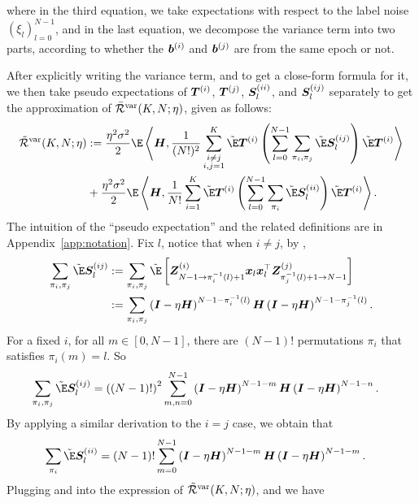 where in the third equation, we take expectations with respect to the label noise$(\xi_l)_{l=0}^{N-1}$, and in the last equation, we decompose the variance term into two parts, according to whether the ${\bm{b}}^{(i)}$ and ${\bm{b}}^{(j)}$ are from the same epoch or not. 

After explicitly writing the variance term, and to get a close-form formula for it, we then take pseudo expectations of ${\bm{T}}^{(i)}$, ${\bm{T}}^{(j)}$, ${\bm{S}}_{l}^{(ii)}$, and ${\bm{S}}_{l}^{(ij)}$ separately to get the approximation of $\bar{\mathcal{R}}^{\mathrm{var}}(K,N;\eta)$, given as follows:
\begin{align*} 
    \Tilde{\cR}^{\var}(K,N;\eta)&:=\frac{\eta^2\sigma^2}{2}\E\inp{\mH}{\frac{1}{(N!)^2}\sum_{\substack{i\neq j \\i,j=1}}^K\fakeE\mT^{(i)}\left(\sum_{l=0}^{N-1}\sum_{\pi_i, \pi_j}\fakeE \mS_l^{(ij)}\right)\fakeE\mT^{(i)}} \\
    &+\frac{\eta^2\sigma^2}{2}\E\inp{\mH}{\frac{1}{N!}\sum_{i=1}^K\fakeE\mT^{(i)}\left(\sum_{l=0}^{N-1}\sum_{\pi_i}\fakeE \mS_l^{(ii)}\right)\fakeE\mT^{(i)}}. \\
\end{align*} 
The intuition of the ``pseudo expectation'' and the related definitions are in Appendix~\ref{app:notation}. Fix $l$, notice that when $i\neq j$, by , 
\begin{align*}
    \sum_{\pi_i, \pi_j}\fakeE\mS_l^{(ij)} &:=\sum_{\pi_i, \pi_j}\fakeE \left[\mZ_{N-1 \to \pi_i^{-1}(l)+1}^{(i)}\vx_l\vx_l^{\top} \mZ_{\pi_j^{-1}(l)+1 \to N-1}^{(j)}\right] \\
    &:=\sum_{\pi_i, \pi_j}\left(\mI-\eta\mH\right)^{N-1-\pi_i^{-1}(l)}\mH\left(\mI-\eta\mH\right)^{N-1-\pi_j^{-1}(l)}. \\
\end{align*}
For a fixed $i$, for all $m\in[0,N-1]$, there are $(N-1)!$ permutations $\pi_i$ that satisfies $\pi_i(m)=l$. So
\begin{align}
    \sum_{\pi_i, \pi_j}\fakeE\mS_l^{(ij)} 
    &=\left((N-1)!\right)^2\sum_{m,n=0}^{N-1}\left(\mI-\eta\mH\right)^{N-1-m}\mH\left(\mI-\eta\mH\right)^{N-1-n}.\label{equ:S_ij}
\end{align}
By applying a similar derivation to the $i = j$ case, we obtain that 
\begin{align}
    \sum_{\pi_i}\fakeE\mS_l^{(ii)} 
    &=(N-1)!\sum_{m=0}^{N-1}\left(\mI-\eta\mH\right)^{N-1-m}\mH\left(\mI-\eta\mH\right)^{N-1-m}.\label{equ:S_ii}
\end{align}
Plugging  and  into the expression of $\Tilde{\mathcal{R}}^{\mathrm{var}}(K,N;\eta)$, and we have
